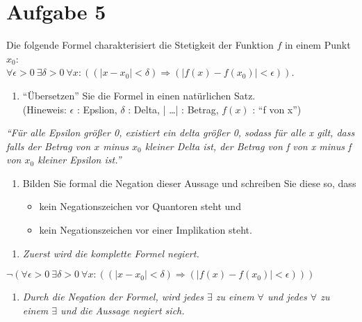 \section*{Aufgabe 5}

Die folgende Formel charakterisiert die Stetigkeit der Funktion $f$ in einem Punkt $x_0$:\\
$\forall \epsilon > 0 \ \exists \delta > 0 \ \forall  x : ((| x - x_0 | < \delta) \Rightarrow (| f(x) - f(x_0)| < \epsilon))$.

\begin{enumerate}[label={a)}, leftmargin=*]
\item ``Übersetzen'' Sie die Formel in einen natürlichen Satz.\\
(Hineweis: $\epsilon$ : Epslion, $\delta$ : Delta, | \dots | : Betrag, $f(x)$ : ``f von x'')
\end{enumerate}

\textit{``Für alle Epsilon größer 0, existiert ein delta größer 0, sodass für alle x gilt, dass falls der Betrag von $x$ minus $x_0$ kleiner Delta ist, der Betrag von f von x minus f von $x_0$ kleiner Epsilon ist.''}

\begin{enumerate}[label={b)}, leftmargin=*]
\item Bilden Sie formal die Negation dieser Aussage und schreiben Sie diese so, dass
\begin{itemize}
\item kein Negationszeichen vor Quantoren steht und
\item kein Negationszeichen vor einer Implikation steht.
\end{itemize}
\end{enumerate}

\begin{enumerate}[leftmargin=*]
\item \textit{Zuerst wird die komplette Formel negiert.}
\end{enumerate}

\begin{center}
$\lnot (\forall \epsilon > 0 \ \exists \delta > 0 \ \forall  x : ((| x - x_0 | < \delta) \Rightarrow (| f(x) - f(x_0)| < \epsilon)))$
\end{center}


\begin{enumerate}[label={2.}, leftmargin=*]
\item \textit{Durch die Negation der Formel, wird jedes $\exists$ zu einem $\forall$ und jedes $\forall$ zu einem $\exists$ und die Aussage negiert sich.}
\end{enumerate}

